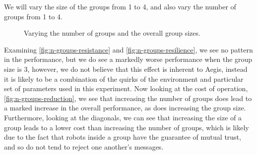 We will vary the size of the groups from 1 to 4, and also vary the number of groups from 1 to 4.
\begin{figure}[!h]
	\centering
	\caption{Varying the number of groups and the overall group sizes.}
\end{figure}

Examining \autoref{fig:n-groups-resistance} and \autoref{fig:n-groups-resilience}, we see no pattern in the performance, but we do see a markedly worse performance when the group size is 3, however, we do not believe that this effect is inherent to Aegis, instead it is likely to be a combination of the quirks of the environment and particular set of parameters used in this experiment. Now looking at the cost of operation, \autoref{fig:n-groups-reduction}, we see that increasing the number of groups does lead to a marked increase in the overall performance, as does increasing the group size. Furthermore, looking at the diagonals, we can see that increasing the size of a group leads to a lower cost than increasing the number of groups, which is likely due to the fact that robots inside a group have the guarantee of mutual trust, and so do not tend to reject one another's messages.


